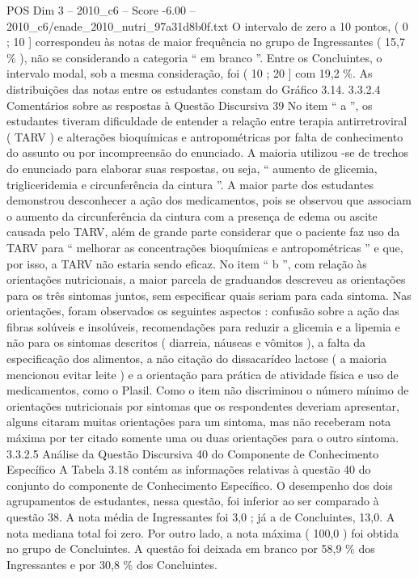 \begin{textsample}{POS Dim 3 – 2010\_c6 – Score -6.00 – 2010\_c6/enade\_2010\_nutri\_97a31d8b0f.txt}
O intervalo de zero a 10 pontos, ( 0 ; 10 ] correspondeu às notas de maior frequência no grupo de Ingressantes ( 15,7 \% ), não se considerando a categoria “ em branco ”.
Entre os Concluintes, o intervalo modal, sob a mesma consideração, foi ( 10 ; 20 ] com 19,2 \%.
As distribuições das notas entre os estudantes constam do Gráfico 3.14. 3.3.2.4 Comentários sobre as respostas à Questão Discursiva 39 No item “ a ”, os estudantes tiveram dificuldade de entender a relação entre terapia antirretroviral ( TARV ) e alterações bioquímicas e antropométricas por falta de conhecimento do assunto ou por incompreensão do enunciado.
A maioria utilizou -se de trechos do enunciado para elaborar suas respostas, ou seja, “ aumento de glicemia, trigliceridemia e circunferência da cintura ”.
A maior parte dos estudantes demonstrou desconhecer a ação dos medicamentos, pois se observou que associam o aumento da circunferência da cintura com a presença de edema ou ascite causada pelo TARV, além de grande parte considerar que o paciente faz uso da TARV para “ melhorar as concentrações bioquímicas e antropométricas ” e que, por isso, a TARV não estaria sendo eficaz.
No item “ b ”, com relação às orientações nutricionais, a maior parcela de graduandos descreveu as orientações para os três sintomas juntos, sem especificar quais seriam para cada sintoma.
Nas orientações, foram observados os seguintes aspectos : confusão sobre a ação das fibras solúveis e insolúveis, recomendações para reduzir a glicemia e a lipemia e não para os sintomas descritos ( diarreia, náuseas e vômitos ), a falta da especificação dos alimentos, a não citação do dissacarídeo lactose ( a maioria mencionou evitar leite ) e a orientação para prática de atividade física e uso de medicamentos, como o Plasil.
Como o item não discriminou o número mínimo de orientações nutricionais por sintomas que os respondentes deveriam apresentar, alguns citaram muitas orientações para um sintoma, mas não receberam nota máxima por ter citado somente uma ou duas orientações para o outro sintoma. 3.3.2.5 Análise da Questão Discursiva 40 do Componente de Conhecimento Específico A Tabela 3.18 contém as informações relativas à questão 40 do conjunto do componente de Conhecimento Específico.
O desempenho dos dois agrupamentos de estudantes, nessa questão, foi inferior ao ser comparado à questão 38.
A nota média de Ingressantes foi 3,0 ; já a de Concluintes, 13,0.
A nota mediana total foi zero.
Por outro lado, a nota máxima ( 100,0 ) foi obtida no grupo de Concluintes.
A questão foi deixada em branco por 58,9 \% dos Ingressantes e por 30,8 \% dos Concluintes.

\end{textsample}
